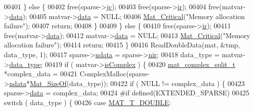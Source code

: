 \begin{DoxyCode}
{00401                     \} \textcolor{keywordflow}{else} \{
00402                         free(sparse->\hyperlink{group___m_a_t_ad1e74cdc4f7eff1e47a670297c01da4b}{jc});
00403                         free(sparse->\hyperlink{group___m_a_t_a8d4c863d704edddec5cbfa15b2d719c8}{ir});
00404                         free(matvar->\hyperlink{group___m_a_t_a5672978efa230bbdecdf38ede781f7fa}{data});
00405                         matvar->\hyperlink{group___m_a_t_a5672978efa230bbdecdf38ede781f7fa}{data} = NULL;
00406                         \hyperlink{group__mat__util_gaf51f2bfbb5580f575e4dd79757e2b80c}{Mat\_Critical}(\textcolor{stringliteral}{"Memory allocation failure"});
00407                         \textcolor{keywordflow}{return};
00408                     \}
00409                 \} \textcolor{keywordflow}{else} \{
00410                     free(sparse->\hyperlink{group___m_a_t_a8d4c863d704edddec5cbfa15b2d719c8}{ir});
00411                     free(matvar->\hyperlink{group___m_a_t_a5672978efa230bbdecdf38ede781f7fa}{data});
00412                     matvar->\hyperlink{group___m_a_t_a5672978efa230bbdecdf38ede781f7fa}{data} = NULL;
00413                     \hyperlink{group__mat__util_gaf51f2bfbb5580f575e4dd79757e2b80c}{Mat\_Critical}(\textcolor{stringliteral}{"Memory allocation failure"});
00414                     \textcolor{keywordflow}{return};
00415                 \}
00416                 ReadDoubleData(mat, &tmp, data\_type, 1);
00417                 sparse->\hyperlink{group___m_a_t_a1beb8a8c58a808207cbea650563a9b63}{ndata} = sparse->\hyperlink{group___m_a_t_aa64636ad57cf87f7a28ff5018437a850}{nir};
00418                 data\_type = matvar->\hyperlink{group___m_a_t_ab6aafe9bd77f0f077852593dec438144}{data\_type};
00419                 \textcolor{keywordflow}{if} ( matvar->\hyperlink{group___m_a_t_aeb03b3a69f108dc05470b00443a43739}{isComplex} ) \{
00420                     \hyperlink{group___m_a_t_structmat__complex__split__t}{mat\_complex\_split\_t} *complex\_data =
00421                         ComplexMalloc(sparse->\hyperlink{group___m_a_t_a1beb8a8c58a808207cbea650563a9b63}{ndata}*\hyperlink{group__mat__util_gab6774aabdc124c540c1e7686d0804940}{Mat\_SizeOf}(data\_type));
00422                     \textcolor{keywordflow}{if} ( NULL != complex\_data ) \{
00423                         sparse->\hyperlink{group___m_a_t_ae2c648cb9eac4ce47f26cddb44246152}{data} = complex\_data;
00424 \textcolor{preprocessor}{#if defined(EXTENDED\_SPARSE)}
00425                         \textcolor{keywordflow}{switch} ( data\_type ) \{
00426                             \textcolor{keywordflow}{case} \hyperlink{group___m_a_t_ggacf7b3b879282b7ab3a51190e49bf3453a31e721ecf7e188196f83c32838288797}{MAT\_T\_DOUBLE}:
}
\end{DoxyCode}
